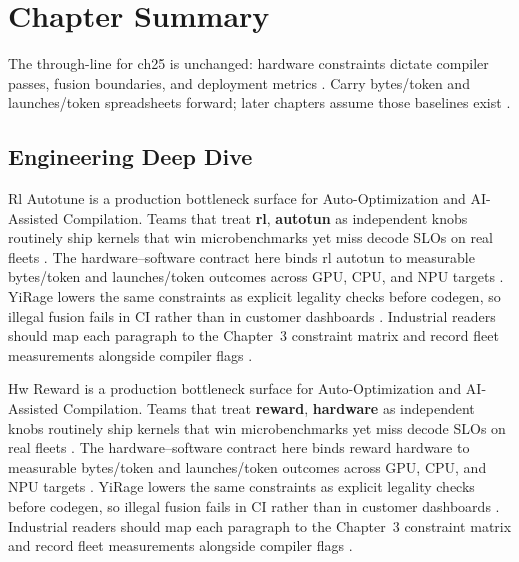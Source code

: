 \section{Chapter Summary}
\label{sec:ch25_summary}

The through-line for ch25 is unchanged: hardware constraints dictate compiler passes, fusion boundaries, and deployment metrics \citep{memoryfloor2026,amd2024xdna}. Carry bytes/token and launches/token spreadsheets forward; later chapters assume those baselines exist \citep{semianalysis2024tma,dlbook}.


\subsection{Engineering Deep Dive}
\label{sec:ch25_deep_dive}

Rl Autotune is a production bottleneck surface for Auto-Optimization and AI-Assisted Compilation. Teams that treat \textbf{rl}, \textbf{autotun} as independent knobs routinely ship kernels that win microbenchmarks yet miss decode SLOs on real fleets \citep{semianalysis2024tma,dlbook}. The hardware--software contract here binds rl autotun to measurable bytes/token and launches/token outcomes across GPU, CPU, and NPU targets \citep{amd2024xdna,dao2022flashattention}. YiRage lowers the same constraints as explicit legality checks before codegen, so illegal fusion fails in CI rather than in customer dashboards \citep{amd2024aie,kwon2023vllm}. Industrial readers should map each paragraph to the Chapter~3 constraint matrix and record fleet measurements alongside compiler flags \citep{dlbook,nvidia2024cudagraphs}.

Hw Reward is a production bottleneck surface for Auto-Optimization and AI-Assisted Compilation. Teams that treat \textbf{reward}, \textbf{hardware} as independent knobs routinely ship kernels that win microbenchmarks yet miss decode SLOs on real fleets \citep{amd2024xdna,dao2022flashattention}. The hardware--software contract here binds reward hardware to measurable bytes/token and launches/token outcomes across GPU, CPU, and NPU targets \citep{amd2024aie,kwon2023vllm}. YiRage lowers the same constraints as explicit legality checks before codegen, so illegal fusion fails in CI rather than in customer dashboards \citep{dlbook,nvidia2024cudagraphs}. Industrial readers should map each paragraph to the Chapter~3 constraint matrix and record fleet measurements alongside compiler flags \citep{dao2022flashattention,liu2024deepseekv3}.

